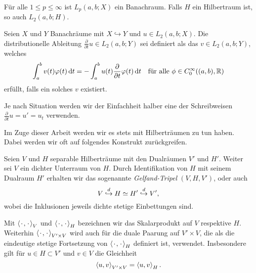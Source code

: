 \begin{Lemma}
\label{lemma:gl:bochner_ist_banach}
    Für alle $1 \leq p \leq \infty$ ist $L_{p}(a, b; X)$ ein Banachraum.
    Falls $H$ ein Hilbertraum ist, so auch $L_{2}(a, b; H)$.
\end{Lemma}

\begin{Definition}
\label{definition:gl:schwache_zeitableitung}
    Seien $X$ und $Y$ Banachräume mit $X \hookrightarrow Y$ und $u \in L_{2}(a, b; X)$.
    Die distributionelle Ableitung $\frac{\partial}{\partial t} u \in L_{2}(a, b; Y)$ sei definiert als das $v \in L_{2}(a, b; Y)$, welches
    \begin{equation}
        \int_{a}^{b} v(t) \varphi(t) \diff t = - \int_{a}^{b} u(t) \frac{\partial}{\partial t} \varphi(t) \diff t \quad \fa \phi \in C^{\infty}_{0}((a, b), \mathbb{R})
    \end{equation}
    erfüllt, falls ein solches $v$ existiert.
\end{Definition}

\begin{Bemerkung}
    Je nach Situation werden wir der Einfachheit halber eine der Schreibweisen $\frac{\partial}{\partial t} u = u' = u_{t}$ verwenden.
\end{Bemerkung}

Im Zuge dieser Arbeit werden wir es stets mit Hilberträumen zu tun haben.
Dabei werden wir oft auf folgendes Konstrukt zurückgreifen.

\begin{Definition}
\label{definition:gl:gelfand_tripel}
    Seien $V$ und $H$ separable Hilberträume mit den Dualräumen $V'$ und $H'$.
    Weiter sei $V$ ein dichter Unterraum von $H$.
    Durch Identifikation von $H$ mit seinem Dualraum $H'$ erhalten wir das sogenannte \emph{Gelfand-Tripel} $(V, H, V')$, oder auch
    \begin{equation}
        V \denseinclusion H \simeq H' \denseinclusion V',
    \end{equation}
    wobei die Inklusionen jeweils dichte stetige Einbettungen sind.
\end{Definition}

\begin{Bemerkung}
    Mit $\skprod{\blank}{\blank}_{V}$ und $\skprod{\blank}{\blank}_{H}$ bezeichnen wir das Skalarprodukt auf $V$ respektive $H$.
    Weiterhin $\skprod{\blank}{\blank}_{V' \times V}$ wird auch für die duale Paarung auf $V' \times V$, die als die eindeutige stetige Fortsetzung von $\skprod{\blank}{\blank}_{H}$ definiert ist, verwendet.
    Insbesondere gilt für $u \in H \subset V'$ und $v \in V$ die Gleichheit
    \begin{equation}
        \skprod{u}{v}_{V' \times V} = \skprod{u}{v}_{H}.
    \end{equation}
\end{Bemerkung}

